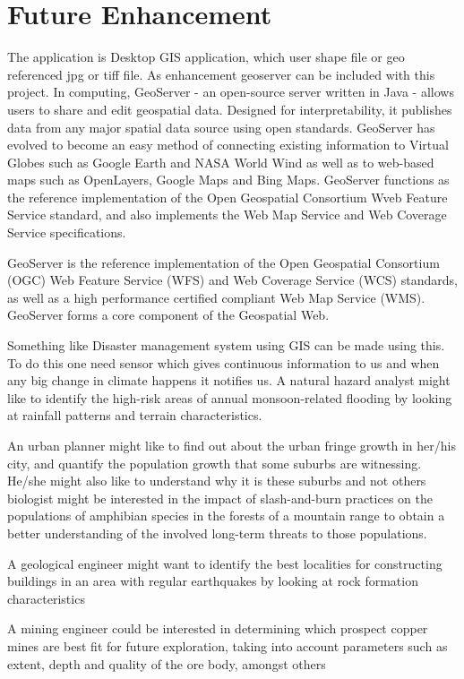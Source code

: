 \chapter{Future Enhancement}
 The application is Desktop GIS application, which user shape file or geo referenced jpg or tiff file. As enhancement geoserver can be included with this project. In computing, GeoServer - an open-source server written in Java - allows users to share and edit geospatial data. Designed for interpretability, it publishes data from any major spatial data source using open standards. GeoServer has evolved to become an easy method of connecting existing information to Virtual Globes such as Google Earth and NASA World Wind as well as to web-based maps such as OpenLayers, Google Maps and Bing Maps. GeoServer functions as the reference implementation of the Open Geospatial Consortium Wveb Feature Service standard, and also implements the Web Map Service and Web Coverage Service specifications.

GeoServer is the reference implementation of the Open Geospatial Consortium (OGC) Web Feature Service (WFS) and Web Coverage Service (WCS) standards, as well as a high performance certified compliant Web Map Service (WMS). GeoServer forms a core component of the Geospatial Web.

Something like Disaster management system using GIS can be made using this. To do this one need sensor which gives continuous information to us and when any big change in climate happens it notifies us. A natural hazard analyst might like to identify the high-risk areas of annual monsoon-related flooding by looking at rainfall patterns and terrain characteristics.

An urban planner might like to find out about the urban fringe growth in her/his city, and quantify the population growth that some suburbs are witnessing. He/she might also like to understand why it is these suburbs and not others biologist might be interested in the impact of slash-and-burn practices on the populations of amphibian species in the forests of a mountain range to obtain a better understanding of the involved long-term threats to those populations.

A geological engineer might want to identify the best localities for constructing buildings in an area with regular earthquakes by looking at rock formation characteristics

A mining engineer could be interested in determining which prospect copper mines are best fit for future exploration, taking into account parameters such as extent, depth and quality of the ore body, amongst others

